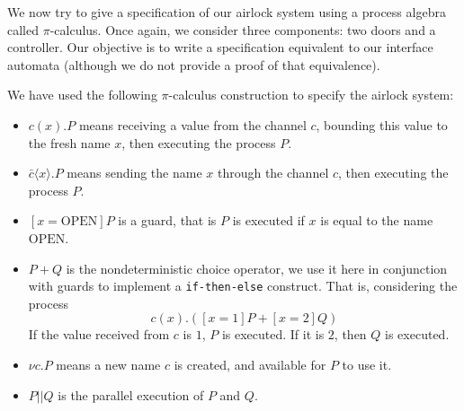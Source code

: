 \begin{example}
  \label{example:sota:airlockprocess}

  We now try to give a specification of our airlock system using a process
  algebra called \( \pi \)-calculus.
  Once again, we consider three components: two doors and a controller.
  Our objective is to write a specification equivalent to our interface automata
  (although we do not provide a proof of that equivalence).

  We have used the following \( \pi \)-calculus construction to specify the
  airlock system:
  \begin{itemize}
  \item \( c(x). P\) means receiving a value from the channel \( c \), bounding
    this value to the fresh name \( x \), then executing the process \( P \).
  \item \( \bar{c} \langle x \rangle . P \) means sending the name \( x \)
    through the channel \( c \), then executing the process \( P \).
  \item \( [x = \mathrm{OPEN}] P \) is a guard, that is \( P \) is executed if
    \( x \) is equal to the name \( \mathrm{OPEN} \).
  \item \( P + Q \) is the nondeterministic choice operator, we use it here in
    conjunction with guards to implement a \texttt{if-then-else} construct. That
    is, considering the process
    \[
      c(x) . ([x = 1] P + [x = 2] Q)
    \]
    If the value received from \( c \) is \( 1 \), \( P \) is executed.
    If it is \( 2 \), then \( Q \) is executed.
  \item \( \nu c. P \) means a new name \( c \) is created, and available for
    \( P \) to use it.
  \item \( P || Q \) is the parallel execution of \( P \) and \( Q \).
  \end{itemize}


\end{example}
